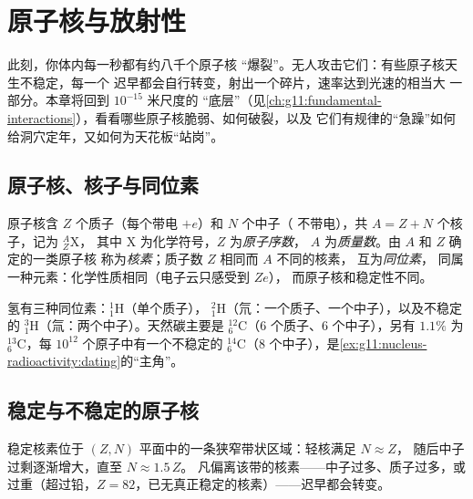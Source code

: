 \chapter{原子核与放射性}\label{ch:g11:nucleus-radioactivity}

此刻，你体内每一秒都有约八千个原子核
“爆裂”。无人攻击它们：有些原子核天生不稳定，每一个
迟早都会自行转变，射出一个碎片，速率达到光速的相当大
一部分。本章将回到 $10^{-15}$ 米尺度的
“底层”（见\cref{ch:g11:fundamental-interactions}），看看哪些原子核脆弱、如何破裂，以及
它们有规律的“急躁”如何给洞穴定年，又如何为天花板“站岗”。

\section{原子核、核子与同位素}

\begin{definition}[原子核记号]\label{def:g11:nucleus-radioactivity:notation}
原子核含 $Z$ 个质子（每个带电 $+e$）和 $N$ 个中子（
不带电），共 $A = Z + N$ 个核子，记为 ${}^{A}_{Z}\mathrm{X}$，
其中 $\mathrm X$ 为化学符号，$Z$ 为\emph{原子序数}，
$A$ 为\emph{质量数}。由 $A$ 和 $Z$ 确定的一类原子核
称为\emph{核素}；质子数 $Z$ 相同而 $A$ 不同的核素，
互为\emph{同位素}，
同属一种元素：化学性质相同（电子云只感受到 $Ze$），
而原子核和稳定性不同。
\end{definition}

\begin{example}[氢与碳]\label{ex:g11:nucleus-radioactivity:hc}
氢有三种同位素：${}^{1}_{1}\mathrm{H}$（单个质子），
${}^{2}_{1}\mathrm{H}$（氘：一个质子、一个中子），以及不稳定的
${}^{3}_{1}\mathrm{H}$（氚：两个中子）。天然碳主要是
${}^{12}_{6}\mathrm{C}$（$6$ 个质子、$6$ 个中子），另有 $1.1\%$ 为
${}^{13}_{6}\mathrm{C}$，每 $10^{12}$ 个原子中有一个不稳定的
${}^{14}_{6}\mathrm{C}$（$8$ 个中子），是\cref{ex:g11:nucleus-radioactivity:dating}的“主角”。
\end{example}

\section{稳定与不稳定的原子核}

\begin{proposition}[稳定谷]\label{prop:g11:nucleus-radioactivity:valley}
稳定核素位于 $(Z, N)$ 平面中的一条狭窄带状区域：轻核满足 $N \approx Z$，
随后中子过剩逐渐增大，直至 $N \approx 1.5\,Z$。
凡偏离该带的核素——中子过多、质子过多，或
过重（超过铅，$Z = 82$，已无真正稳定的核素）——迟早都会转变。
\end{proposition}
\admitted

